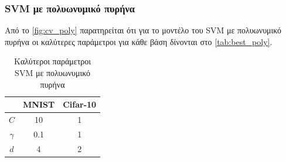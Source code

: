 \documentclass[a4paper]{article}
\begin{document}
\subsubsection{SVM με πολυωνυμικό πυρήνα}

Από το \autoref{fig:cv_poly} παρατηρείται ότι για το μοντέλο του SVM με
πολυωνυμικό πυρήνα οι καλύτερες παράμετροι για κάθε βάση δίνονται στο
\autoref{tab:best_poly}.

\begin{table}[h]
\centering
\begin{tabular}{|c|c|c|}
\hline
         & MNIST & Cifar-10 \\ \hline
$C$      & 10    & 1        \\ \hline
$\gamma$ & 0.1   & 1        \\ \hline
$d$      & 4     & 2        \\ \hline
\end{tabular}
\caption{Καλύτεροι παράμετροι SVM με πολυωνυμικό πυρήνα}
\label{tab:best_poly}
\end{table}
\end{document}
